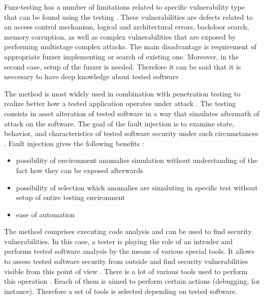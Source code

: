 %
Fuzz-testing has a number of limitations related to specific vulnerability type that can be found using the testing . 
%
These vulnerabilities are defects related to an access control mechanism, logical and architectural errors, backdoor search, memory corruption, as well as complex vulnerabilities that are exposed by performing multistage complex attacks. 
%
The main disadvantage is requirement of appropriate fuzzer implementing or search of existing one. 
%
Moreover, in the second case, setup of the fuzzer is needed. 
%
Therefore it can be said that it is neccesary to have deep knowledge about tested software . 



%
The method is most widely used in combination with penetration testing to realize better how a tested application operates under attack . 
%
The testing consists in asset alteration of tested software in a way that simulates aftermath of attack on the software. 
%
The goal of the fault injection is to examine state, behavior, and characteristics of tested software security under such circumstances . 
%
Fault injection gives the following benefits :
\begin{itemize}
	\leftskip2em%
	\setlength{\itemsep}{0pt}%
	\setlength{\parsep}{0pt}%

	\item possibility of environment anomalies simulation without understanding of the fact how they can be exposed afterwards
	\item possibility of selection which anomalies are simaluting in \A specific test without setup of entire testing environment
	\item ease of automation
\end{itemize}



%
The method comprises executing code analysis and can be used to find security vulnerabilities. 
%
In this case, a tester is playing the role of an intruder and performs tested software analysis by the means of various special tools. 
%
It allows to assess tested software security from outside and find security vulnerabilities visible from this point of view . 
%
There is a lot of various tools used to perform this operation . 
%
Eeach of them is aimed to perform certain actions (debugging, for instance). 
%
Therefore a set of tools is selected depending on tested software. 

